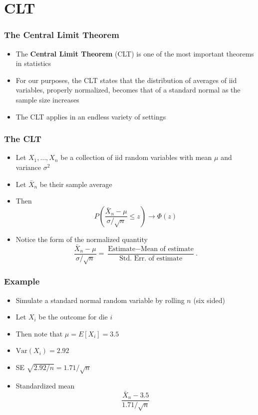\documentclass[aspectratio=169]{beamer}
\newcommand{\Var}{\mathrm{Var}}
\begin{document}
\section{CLT}
\begin{frame}\frametitle{The Central Limit Theorem}
  \begin{itemize}
  \item The {\bf Central Limit Theorem} (CLT) is one of the most important theorems in statistics
  \item For our purposes, the CLT states that the distribution of
    averages of iid variables, properly normalized, becomes that of a
    standard normal as the sample size increases
  \item The CLT applies in an endless variety of settings
  \end{itemize}
\end{frame}

\begin{frame}\frametitle{The CLT}
  \begin{itemize}
  \item Let $X_1,\ldots,X_n$ be a collection of iid random variables
    with mean $\mu$ and variance $\sigma^2$
  \item Let $\bar X_n$ be their sample average
  \item Then
    \begin{equation*}
      P\left( \frac{\bar X_n - \mu}{\sigma / \sqrt{n}} \leq z \right) \rightarrow \Phi(z)
    \end{equation*}
  \item Notice the form of the normalized quantity
    $$
    \frac{\bar X_n - \mu}{\sigma / \sqrt{n}} = 
    \frac{\mbox{Estimate} - \mbox{Mean of estimate}}{\mbox{Std. Err. of estimate}}.
    $$
  \end{itemize}
\end{frame}

\begin{frame}\frametitle{Example}
  \begin{itemize}
  \item  Simulate a standard normal random variable by rolling $n$
    (six sided)
  \item Let $X_i$ be the outcome for die $i$
  \item Then note that $\mu = E[X_i] = 3.5$
  \item $\Var(X_i) = 2.92$ 
  \item SE $\sqrt{2.92 / n} = 1.71 / \sqrt{n}$
  \item Standardized mean
    $$
    \frac{\bar X_n - 3.5}{1.71/\sqrt{n}}
    $$ 
  \end{itemize}
\end{frame}
\end{document}
